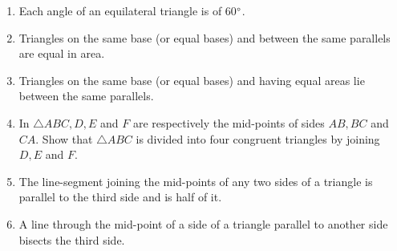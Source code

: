 \renewcommand{\theequation}{\theenumi}
\begin{enumerate}[label=\arabic*.,ref=\thesubsection.\theenumi]
%
\item  Each angle of an equilateral triangle is of 60$\degree$. 
%


\item Triangles on the same base (or equal bases) and between the same parallels are equal in area.
\begin{enumerate}


\end{enumerate}
\item Triangles on the same base (or equal bases) and having equal areas lie between the same parallels.
\item In $\triangle ABC, D, E$ and $F$ are respectively the mid-points of sides $AB, BC$ and $CA $. Show that $\triangle ABC$ is divided into four congruent triangles by joining $D, E$ and $F$.
\item  The line-segment joining the mid-points of any two sides of a triangle is parallel to the third side and is half of it.
\label{prob:tri_mid_similar}
%
\item  A line through the mid-point of a side of a triangle parallel to another side 
bisects the third side.


\end{enumerate}
